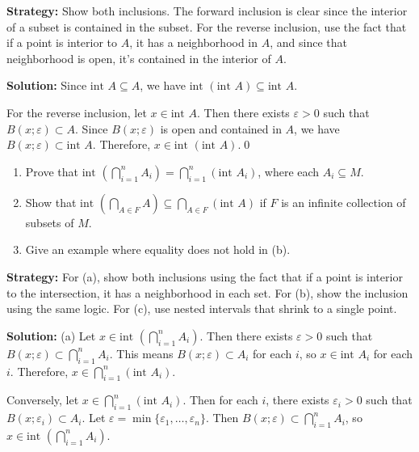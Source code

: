 \noindent\textbf{Strategy:} Show both inclusions. The forward inclusion is clear since the interior of a subset is contained in the subset. For the reverse inclusion, use the fact that if a point is interior to $A$, it has a neighborhood in $A$, and since that neighborhood is open, it's contained in the interior of $A$.

\bigskip\noindent\textbf{Solution:} Since $\text{int } A \subseteq A$, we have $\text{int }(\text{int } A) \subseteq \text{int } A$.

For the reverse inclusion, let $x \in \text{int } A$. Then there exists $\varepsilon > 0$ such that $B(x;\varepsilon) \subset A$. Since $B(x;\varepsilon)$ is open and contained in $A$, we have $B(x;\varepsilon) \subset \text{int } A$. Therefore, $x \in \text{int }(\text{int } A)$.\qed


\begin{problembox}
\begin{enumerate}[label=\alph*)]
\item Prove that \(\text{int } \left(\bigcap_{i=1}^n A_i\right) = \bigcap_{i=1}^n (\text{int } A_i)\), where each \( A_i \subseteq M \).
\item Show that \(\text{int } \left(\bigcap_{A \in F} A\right) \subseteq \bigcap_{A \in F} (\text{int } A)\) if \( F \) is an infinite collection of subsets of \( M \).
\item Give an example where equality does not hold in (b).
\end{enumerate}
\end{problembox}

\noindent\textbf{Strategy:} For (a), show both inclusions using the fact that if a point is interior to the intersection, it has a neighborhood in each set. For (b), show the inclusion using the same logic. For (c), use nested intervals that shrink to a single point.

\bigskip\noindent\textbf{Solution:} 
(a) Let $x \in \text{int }(\bigcap_{i=1}^n A_i)$. Then there exists $\varepsilon > 0$ such that $B(x;\varepsilon) \subset \bigcap_{i=1}^n A_i$. This means $B(x;\varepsilon) \subset A_i$ for each $i$, so $x \in \text{int } A_i$ for each $i$. Therefore, $x \in \bigcap_{i=1}^n (\text{int } A_i)$.

Conversely, let $x \in \bigcap_{i=1}^n (\text{int } A_i)$. Then for each $i$, there exists $\varepsilon_i > 0$ such that $B(x;\varepsilon_i) \subset A_i$. Let $\varepsilon = \min\{\varepsilon_1, \ldots, \varepsilon_n\}$. Then $B(x;\varepsilon) \subset \bigcap_{i=1}^n A_i$, so $x \in \text{int }(\bigcap_{i=1}^n A_i)$.

